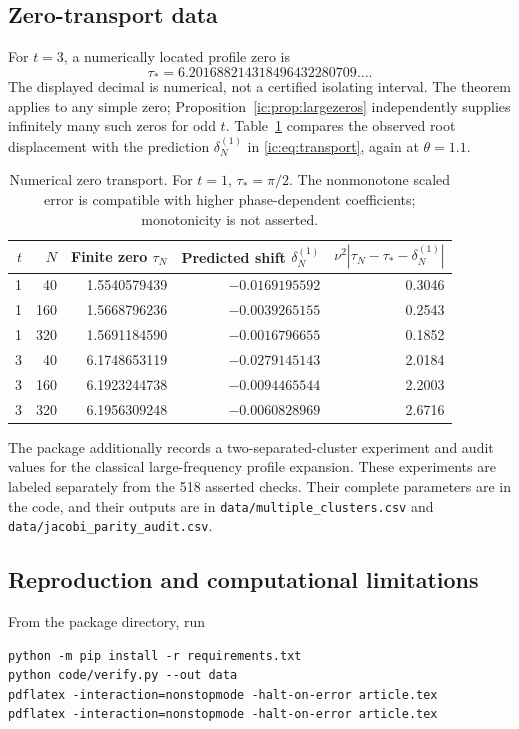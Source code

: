 \documentclass[11pt,a4paper]{article}
\numberwithin{equation}{section}
\theoremstyle{definition}
\theoremstyle{remark}
\begin{document}
\subsection{Zero-transport data}
For $t=3$, a numerically located profile zero is
\[
 \tau_*=6.201688214318496432280709\ldots.
\]
The displayed decimal is numerical, not a certified isolating interval.
The theorem applies to any simple zero; Proposition~\ref{ic:prop:largezeros}
independently supplies infinitely many such zeros for odd $t$.
Table~\ref{ic:tab:zeros} compares the observed root displacement with the
prediction $\delta_N^{(1)}$ in \eqref{ic:eq:transport}, again at $\theta=1.1$.
\begin{table}[htbp]
\centering\small
\begin{tabular}{rrrrr}
\toprule
$t$&$N$&Finite zero $\tau_N$&Predicted shift $\delta_N^{(1)}$&
$\nu^2|\tau_N-\tau_*-\delta_N^{(1)}|$\\
\midrule
1&40 &1.5540579439&$-0.0169195592$&0.3046\\
1&160&1.5668796236&$-0.0039265155$&0.2543\\
1&320&1.5691184590&$-0.0016796655$&0.1852\\
3&40 &6.1748653119&$-0.0279145143$&2.0184\\
3&160&6.1923244738&$-0.0094465544$&2.2003\\
3&320&6.1956309248&$-0.0060828969$&2.6716\\
\bottomrule
\end{tabular}
\caption{Numerical zero transport. For $t=1$, $\tau_*=\pi/2$.
The nonmonotone scaled error is compatible with higher phase-dependent
coefficients; monotonicity is not asserted.}
\label{ic:tab:zeros}
\end{table}

The package additionally records a two-separated-cluster experiment and
audit values for the classical large-frequency profile expansion.
These experiments are labeled separately from the 518 asserted checks.
Their complete parameters are in the code, and their outputs are in
\texttt{data/multiple\_clusters.csv} and
\texttt{data/jacobi\_parity\_audit.csv}.

\subsection{Reproduction and computational limitations}
From the package directory, run
\begin{verbatim}
python -m pip install -r requirements.txt
python code/verify.py --out data
pdflatex -interaction=nonstopmode -halt-on-error article.tex
pdflatex -interaction=nonstopmode -halt-on-error article.tex
\end{verbatim}
\end{document}
